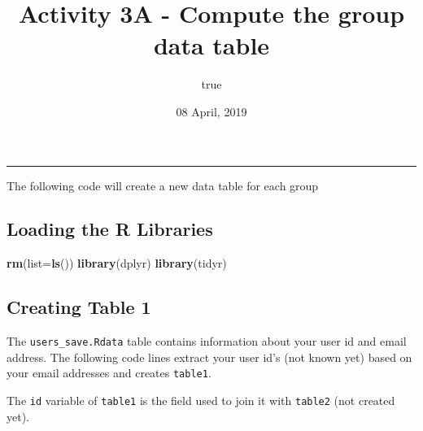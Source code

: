 \documentclass[]{article}
\title{Activity 3A - Compute the group data table}
\author{true}
\date{08 April, 2019}
\newenvironment{Shaded}{\begin{snugshade}}{\end{snugshade}}
\newcommand{\KeywordTok}[1]{\textcolor[rgb]{0.13,0.29,0.53}{\textbf{#1}}}
\newcommand{\DataTypeTok}[1]{\textcolor[rgb]{0.13,0.29,0.53}{#1}}
\newcommand{\StringTok}[1]{\textcolor[rgb]{0.31,0.60,0.02}{#1}}
\newcommand{\CommentTok}[1]{\textcolor[rgb]{0.56,0.35,0.01}{\textit{#1}}}
\newcommand{\OperatorTok}[1]{\textcolor[rgb]{0.81,0.36,0.00}{\textbf{#1}}}
\newcommand{\NormalTok}[1]{#1}
\begin{document}
\maketitle

\begin{center}\rule{0.5\linewidth}{\linethickness}\end{center}

The following code will create a new data table for each group

\subsection{Loading the R Libraries}\label{loading-the-r-libraries}

\begin{Shaded}
\begin{Highlighting}[]
\KeywordTok{rm}\NormalTok{(}\DataTypeTok{list=}\KeywordTok{ls}\NormalTok{())}
\KeywordTok{library}\NormalTok{(dplyr)}
\KeywordTok{library}\NormalTok{(tidyr)}
\end{Highlighting}
\end{Shaded}

\subsection{Creating Table 1}\label{creating-table-1}

The \texttt{users\_save.Rdata} table contains information about your
user id and email address. The following code lines extract your user
id's (not known yet) based on your email addresses and creates
\texttt{table1}.

The \texttt{id} variable of \texttt{table1} is the field used to join it
with \texttt{table2} (not created yet).

\begin{Shaded}
\end{Shaded}
\end{document}
